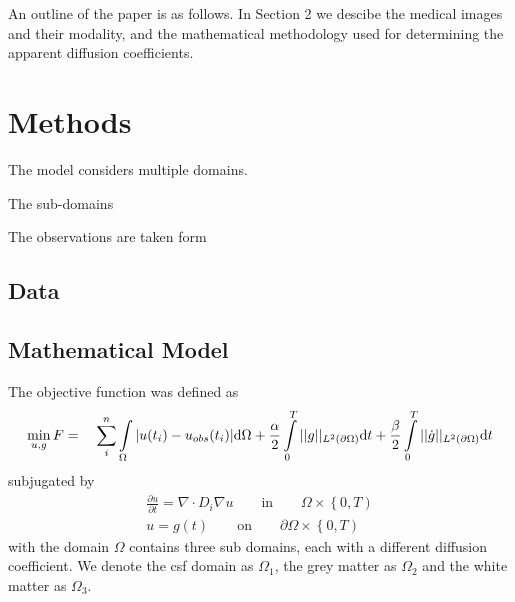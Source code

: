 \documentclass[11pt,a4paper]{article}
\begin{document}
An outline of the paper is as follows. In Section 2 we descibe the medical images and their modality,  
and the mathematical methodology used for determining the apparent diffusion coefficients.  


\section{Methods}

The model considers multiple domains.
 
The sub-domains 


The observations are taken form 




\subsection*{Data}


\subsection*{Mathematical Model}
The objective function was defined as 
\begin{equation}
\min_{u,g} F = \quad \sum\limits_i\sp{n} \int\limits_{\Omega} |u(t_i) - u_{obs}(t_i)| \mathrm{d}\Omega + \frac{\alpha}{2} \int\limits_{0}\sp{T} || g ||_{L\sp{2}(\partial\Omega)} \mathrm{d}t + \frac{\beta}{2} \int\limits_{0}\sp{T} || \dot{g} ||_{L\sp{2}(\partial\Omega)}\mathrm{d}t 
\end{equation}
subjugated by   
\begin{equation}
\begin{aligned}
\frac{\partial u}{\partial t} = \nabla \cdot  D_i \nabla u \qquad \text{in} \qquad \Omega \times \left\lbrace 0 , T \right)  \\
u=g(t) \qquad \text{on} \qquad \partial\Omega  \times \left\lbrace 0 , T \right) 
\end{aligned}
\label{Eq::PDE}
\end{equation}
with the domain $\Omega$ contains three sub domains, each with a different diffusion coefficient. We denote the csf domain as $\Omega_1$, the grey matter as $\Omega_2$ and the white matter as $\Omega_3$.
\end{document}
